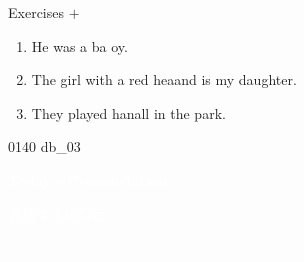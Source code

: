 \documentclass[aspectratio=169,xcolor={dvipsnames,table}]{beamer}
\begin{document}
\begin{frame}[plain]{Exercises  $+$ }
  \Large
  \begin{enumerate}
    \item<2-> He was a ba  oy.
    \item<4-> The girl with a red heaand is my daughter.
    \item<6-> They played hanall in the park.
  \end{enumerate}

  \hfill{\tiny 0140}\,{\scriptsize {}\,db\_03}

\end{frame}
\begin{frame}
  \hypertarget{today}{}
  \centering
  \textcolor{white}{\Huge\bfseries Today's Pronunciation}

  \vspace{30pt}

  \textcolor{white}{\Large 連続する破裂音}

  \textcolor{white}{\Large {} $+$ }

\end{frame}
\end{document}
